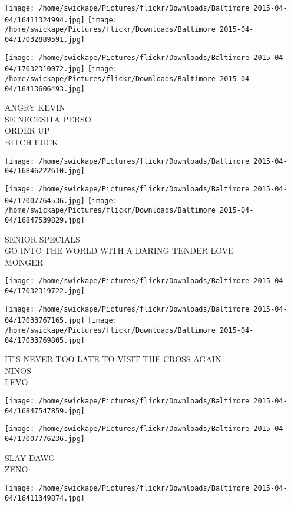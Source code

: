 \documentclass[10pt,letterpaper]{article}
\begin{document}
\texttt{[image: /home/swickape/Pictures/flickr/Downloads/Baltimore 2015-04-04/16411324994.jpg]}
\texttt{[image: /home/swickape/Pictures/flickr/Downloads/Baltimore 2015-04-04/17032889591.jpg]}

\texttt{[image: /home/swickape/Pictures/flickr/Downloads/Baltimore 2015-04-04/17032310072.jpg]}
\texttt{[image: /home/swickape/Pictures/flickr/Downloads/Baltimore 2015-04-04/16413606493.jpg]}

ANGRY KEVIN\\
SE NECESITA PERSO\\
ORDER UP\\
BITCH FUCK
\pagebreak

\texttt{[image: /home/swickape/Pictures/flickr/Downloads/Baltimore 2015-04-04/16846222610.jpg]}

\vspace{0.25in}
\texttt{[image: /home/swickape/Pictures/flickr/Downloads/Baltimore 2015-04-04/17007764536.jpg]}
\texttt{[image: /home/swickape/Pictures/flickr/Downloads/Baltimore 2015-04-04/16847539829.jpg]}

SENIOR SPECIALS\\
GO INTO THE WORLD WITH A DARING TENDER LOVE\\
MONGER
\pagebreak

\texttt{[image: /home/swickape/Pictures/flickr/Downloads/Baltimore 2015-04-04/17032319722.jpg]}

\vspace{0.25in}
\texttt{[image: /home/swickape/Pictures/flickr/Downloads/Baltimore 2015-04-04/17033767165.jpg]}
\texttt{[image: /home/swickape/Pictures/flickr/Downloads/Baltimore 2015-04-04/17033769805.jpg]}

IT'S NEVER TOO LATE TO VISIT THE CROSS AGAIN\\
NINOS\\
LEVO
\pagebreak

\texttt{[image: /home/swickape/Pictures/flickr/Downloads/Baltimore 2015-04-04/16847547859.jpg]}

\vspace{0.25in}
\texttt{[image: /home/swickape/Pictures/flickr/Downloads/Baltimore 2015-04-04/17007776236.jpg]}

SLAY DAWG\\
ZENO
\pagebreak

\texttt{[image: /home/swickape/Pictures/flickr/Downloads/Baltimore 2015-04-04/16411349874.jpg]}
\end{document}
